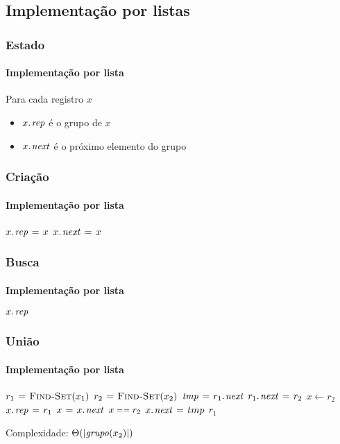 \documentclass{beamer}
\begin{document}
\subsection{Implementação por listas}

\begin{frame}
\frametitle{Estado}
\framesubtitle{Implementação por lista}

Para cada registro $x$
\begin{itemize}
  \item $\attrib{x}{rep}$ é o grupo de $x$
  \item $\attrib{x}{next}$ é o próximo elemento do grupo
\end{itemize}
\end{frame}

\begin{frame}
\frametitle{Criação}
\framesubtitle{Implementação por lista}

\begin{codebox}
\li $\attrib{x}{rep} \gets x$
\li $\attrib{x}{next} \gets x$
\end{codebox}

\end{frame}

\begin{frame}
\frametitle{Busca}
\framesubtitle{Implementação por lista}

\begin{codebox}
\li \Return $\attrib{x}{rep}$
\end{codebox}

\end{frame}

\begin{frame}
\frametitle{União}
\framesubtitle{Implementação por lista}

\begin{codebox}
\li $r_1 \mathrel{\hspace{1pt}=\hspace{1pt}} \textnormal{\scshape Find-Set}(x_1)$
\li $r_2 \mathrel{\hspace{1pt}=\hspace{1pt}} \textnormal{\scshape Find-Set}(x_2)$
\li $\id{tmp} \gets \attrib{r_1}{next}$
\li $\attrib{r_1}{next} \gets r_2$
\li $x \gets r_2$
\li \Repeat
\li   $\attrib{x}{rep} \gets r_1$
\li   $x \gets \attrib{x}{next}$
\li \Until $x \isequal r_2$
\li $\attrib{x}{next} \gets tmp$
\li \Return $r_1$
\end{codebox}
\pause
Complexidade: $\Theta( | \id{grupo}(x_2) |)$
\end{frame}
\end{document}
